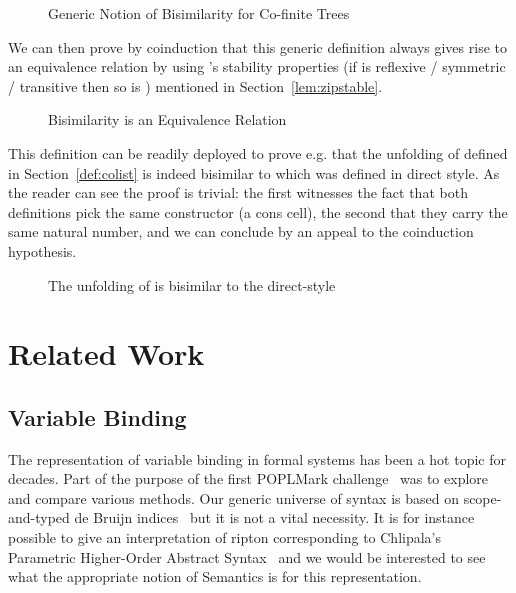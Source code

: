 \begin{figure}[h]
\caption{Generic Notion of Bisimilarity for Co-finite Trees}
\end{figure}

We can then prove by coinduction that this generic definition always gives
rise to an equivalence relation by using 's stability properties
(if  is reflexive / symmetric / transitive then so is {  })
mentioned in Section~\ref{lem:zipstable}.

\begin{figure}[h]
\caption{Bisimilarity is an Equivalence Relation}
\end{figure}

This definition can be readily deployed to prove e.g. that the unfolding
of  defined in Section~\ref{def:colist} is indeed bisimilar to 
which was defined in direct style. As the reader can see the proof is
trivial: the first  witnesses the fact that both definitions
pick the same constructor (a cons cell), the second that they carry the
same natural number, and we can conclude by an appeal to the coinduction
hypothesis.

\begin{figure}[h]
\caption{The unfolding of  is bisimilar to the direct-style }
\end{figure}




\section{Related Work}

\subsection{Variable Binding} The representation of variable binding
in formal systems has been a hot topic for decades. Part of the purpose
of the first POPLMark challenge~\citeyear{poplmark} was to explore and
compare various methods. Our generic universe of syntax is based on
scope-and-typed de Bruijn indices~\cite{de1972lambda} but it is not
a vital necessity. It is for instance possible to give an interpretation
of ripton corresponding to Chlipala's Parametric Higher-Order
Abstract Syntax~\citeyear{chlipala2008parametric} and we would be interested
to see what the appropriate notion of Semantics is for this representation.

